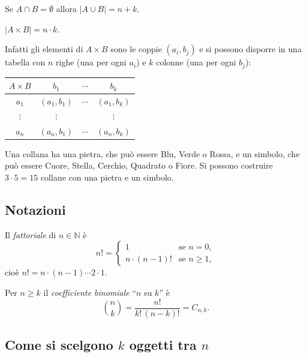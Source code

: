 \documentclass[11pt,a4paper]{article}
\begin{document}
\begin{proprieta}
Se $A \cap B = \emptyset$ allora $|A \cup B| = n + k$.
\end{proprieta}

\begin{proprieta}
$|A \times B| = n \cdot k$.
\end{proprieta}

Infatti gli elementi di $A \times B$ sono le coppie $(a_i, b_j)$ e si possono disporre in una tabella con $n$ righe (una per ogni $a_i$) e $k$ colonne (una per ogni $b_j$):
\begin{center}
\begin{tabular}{c|ccc}
$A \times B$ & $b_1$ & $\cdots$ & $b_k$ \\ \midrule
$a_1$ & $(a_1, b_1)$ & $\cdots$ & $(a_1, b_k)$ \\
$\vdots$ & $\vdots$ & & $\vdots$ \\
$a_n$ & $(a_n, b_1)$ & $\cdots$ & $(a_n, b_k)$
\end{tabular}
\end{center}

\begin{esempio}
Una collana ha una pietra, che può essere Blu, Verde o Rossa, e un simbolo, che può essere Cuore, Stella, Cerchio, Quadrato o Fiore. Si possono costruire $3 \cdot 5 = 15$ collane con una pietra e un simbolo.
\end{esempio}

\subsection{Notazioni}

\begin{definizione}
Il \emph{fattoriale} di $n \in \mathbb{N}$ è
\[
n! = \begin{cases} 1 & \text{se } n = 0, \\ n \cdot (n-1)! & \text{se } n \geq 1, \end{cases}
\]
cioè $n! = n \cdot (n-1) \cdots 2 \cdot 1$.
\end{definizione}

\begin{definizione}
Per $n \geq k$ il \emph{coefficiente binomiale} ``$n$ su $k$'' è
\[
\binom{n}{k} = \frac{n!}{k!\,(n-k)!} = C_{n,k}.
\]
\end{definizione}

\subsection{Come si scelgono $k$ oggetti tra $n$}
\end{document}
